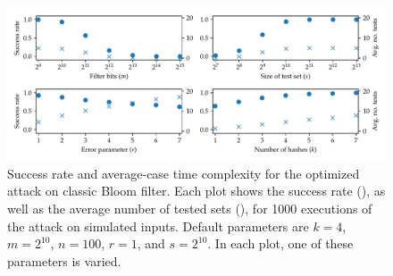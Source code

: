 %
\newcommand{\mydot}{{\scriptsize\ding{108}}}
\newcommand{\myex}{{\scriptsize\ding{53}}}
\begin{figure}
\centering
\includegraphics[page=1,scale=0.675]{fig/bf-correct-attk-sim}
\caption{
  Success rate and average-case time complexity for the optimized attack on classic
  Bloom filter.
  Each plot shows the success rate (\mydot), as well as the average number
  of tested sets (\myex), for 1000 executions of
  the attack on simulated inputs.
  Default parameters are $k=4$, $m=2^{10}$, $n=100$, $r=1$, and $s=2^{10}$.
  In each plot, one of these parameters is varied.
}
\label{fig:bf-correct-attk-sim}
\end{figure}

